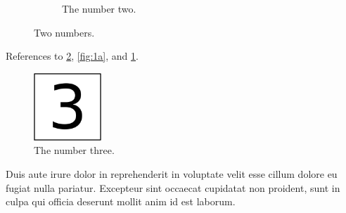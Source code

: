 \begin{figure}
\begin{subfigure}[b]{0.3\textwidth}
    \caption{The number two.}
    \label{fig:1b}
  \end{subfigure}
  \caption{Two numbers.}
  \label{fig:1}
\end{figure}

References to \cref{fig:1}, \cref{fig:1a}, and \cref{fig:1b}.

\begin{figure}
\hypertarget{fig:}{%
\centering
\includegraphics[width=1in,height=\textheight]{img/fig-3.png}
\caption{The number three.}\label{fig:}
}
\end{figure}

Duis aute irure dolor in reprehenderit in voluptate velit esse cillum
dolore eu fugiat nulla pariatur. Excepteur sint occaecat cupidatat non
proident, sunt in culpa qui officia deserunt mollit anim id est laborum.
